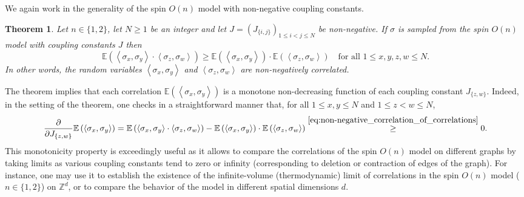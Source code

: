 \documentclass[12pt,reqno]{article}
\def\E{\mathbb{E}}
\def\Z{\mathbb{Z}}
\newtheorem{theorem}{Theorem}[section]
\begin{document}
We again work in the generality of the spin $O(n)$ model with non-negative coupling constants.
\begin{theorem}\label{thm:second_Griffiths_inequality}
  Let $n\in \{1,2\}$, let $N\ge 1$ be an integer and let $J = (J_{\{i,j\}})_{1\le i<j\le N}$ be non-negative.
  If $\sigma$ is sampled from the spin $O(n)$ model with coupling constants $J$ then
  \begin{equation}\label{eq:non-negative_correlation_of_correlations}
     \E\left(\left\langle\sigma_x,\sigma_y\right\rangle\cdot\left\langle\sigma_z,\sigma_w\right\rangle\right)\ge \E\left(\left\langle\sigma_x,\sigma_y\right\rangle\right)\cdot \E\left(\left\langle\sigma_z,\sigma_w\right\rangle\right)\quad\text{for all $1\le x,y,z,w\le N$}.
  \end{equation}
  In other words, the random variables $\left\langle\sigma_x,\sigma_y\right\rangle$ and $\left\langle\sigma_z,\sigma_w\right\rangle$ are non-negatively correlated.
\end{theorem}
The theorem implies that each correlation $\E\left(\left\langle\sigma_x,\sigma_y\right\rangle\right)$ is a monotone non-decreasing function of each coupling constant $J_{\{z,w\}}$. Indeed, in the setting of the theorem, one checks in a straightforward manner that, for all $1\le x,y\le N$ and $1\le z<w\le N$,
\begin{equation*}
  \frac{\partial}{\partial J_{\{z,w\}}} \E\left(\left\langle\sigma_x,\sigma_y\right\rangle\right) = \E\left(\left\langle\sigma_x,\sigma_y\right\rangle\cdot\left\langle\sigma_z,\sigma_w\right\rangle\right)-\E\left(\left\langle\sigma_x,\sigma_y\right\rangle\right)\cdot \E\left(\left\langle\sigma_z,\sigma_w\right\rangle\right)\stackrel{\eqref{eq:non-negative_correlation_of_correlations}}{\ge} 0.
\end{equation*}
This monotonicity property is exceedingly useful as it allows to compare the correlations of the spin $O(n)$ model on different graphs by taking limits as various coupling constants tend to zero or infinity (corresponding to deletion or contraction of edges of the graph). For instance, one may use it to establish the existence of the infinite-volume (thermodynamic) limit of correlations in the spin $O(n)$ model ($n\in \{1,2\}$) on $\Z^d$, or to compare the behavior of the model in different spatial dimensions $d$.
\end{document}
